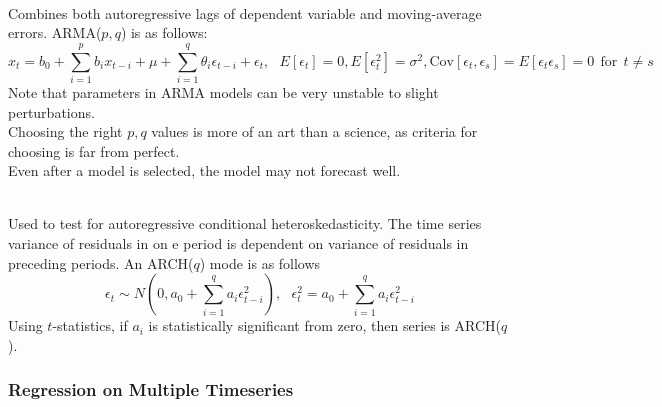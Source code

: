 \begin{definition} \\
Combines both autoregressive lags of dependent variable and moving-average errors. ARMA($p,q$) is as follows:
\begin{equation}
x_t = b_0 + \sum\limits_{i=1}^p b_i x_{t-i} + \mu + \sum\limits_{i=1}^q \theta_i \epsilon_{t-i} + \epsilon_t, \ \ \ E[\epsilon_t] = 0, E[\epsilon_t^2] = \sigma^2, \text{Cov}[\epsilon_t, \epsilon_s] = E[\epsilon_t \epsilon_s] = 0 \ \ \text{for} \ \ t \neq s \nonumber
\end{equation}
Note that parameters in ARMA models can be very unstable to slight perturbations.\\
Choosing the right $p,q$ values is more of an art than a science, as criteria for choosing is far from perfect.\\
Even after a model is selected, the model may not forecast well.
\end{definition}

\begin{definition} \\
Used to test for autoregressive conditional heteroskedasticity. The time series variance of residuals in on e period is dependent on variance of residuals in preceding periods. An ARCH($q$) mode is as follows
\begin{equation}
\epsilon_t \sim N \left( 0, a_0 + \sum\limits_{i=1}^q a_i \epsilon_{t-i}^2 \right), \ \ \ \epsilon_t^2 = a_0 + \sum\limits_{i=1}^q a_i \epsilon_{t-i}^2 \nonumber
\end{equation}
Using $t$-statistics, if $a_i$ is statistically significant from zero, then series is ARCH($q$).
\end{definition}

\subsubsection{Regression on Multiple Timeseries}


